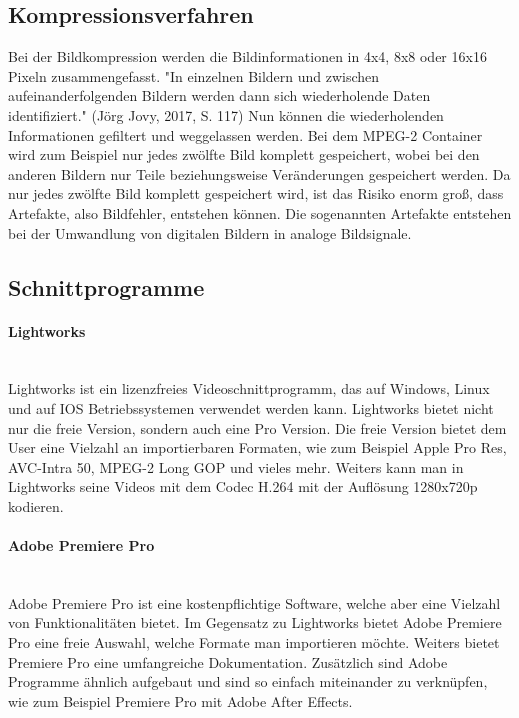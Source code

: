 \subsection{Kompressionsverfahren}
Bei der Bildkompression werden die Bildinformationen in 4x4, 8x8 oder 16x16 Pixeln zusammengefasst. "In einzelnen Bildern und zwischen aufeinanderfolgenden Bildern werden dann sich wiederholende Daten identifiziert." (Jörg Jovy, 2017, S. 117)\newline
Nun können die wiederholenden Informationen gefiltert und weggelassen werden. Bei dem MPEG-2 Container wird zum Beispiel nur jedes zwölfte Bild komplett gespeichert, wobei bei den anderen Bildern nur Teile beziehungsweise Veränderungen gespeichert werden. Da nur jedes zwölfte Bild komplett gespeichert wird, ist das Risiko enorm groß, dass Artefakte, also Bildfehler, entstehen können. Die sogenannten Artefakte entstehen bei der Umwandlung von digitalen Bildern in analoge Bildsignale.\citep{kompression}
\subsection{Schnittprogramme}
\paragraph{Lightworks}
\leavevmode \\
Lightworks ist ein lizenzfreies Videoschnittprogramm, das auf Windows, Linux und auf IOS Betriebssystemen verwendet werden kann. Lightworks bietet nicht nur die freie Version, sondern auch eine Pro Version. Die freie Version bietet dem User eine Vielzahl an importierbaren Formaten, wie zum Beispiel Apple Pro Res, AVC-Intra 50, MPEG-2 Long GOP und vieles mehr. Weiters kann man in Lightworks seine Videos mit dem Codec H.264 mit der Auflösung 1280x720p kodieren.\citep{lightworks}\citep{lightworksZwei}
\paragraph{Adobe Premiere Pro}
\leavevmode \\
Adobe Premiere Pro ist eine kostenpflichtige Software, welche aber eine Vielzahl von Funktionalitäten bietet. Im Gegensatz zu Lightworks bietet Adobe Premiere Pro eine freie Auswahl, welche Formate man importieren möchte. Weiters bietet Premiere Pro eine umfangreiche Dokumentation. Zusätzlich sind Adobe Programme ähnlich aufgebaut und sind so einfach miteinander zu verknüpfen, wie zum Beispiel Premiere Pro mit Adobe After Effects.\citep{premiere}
